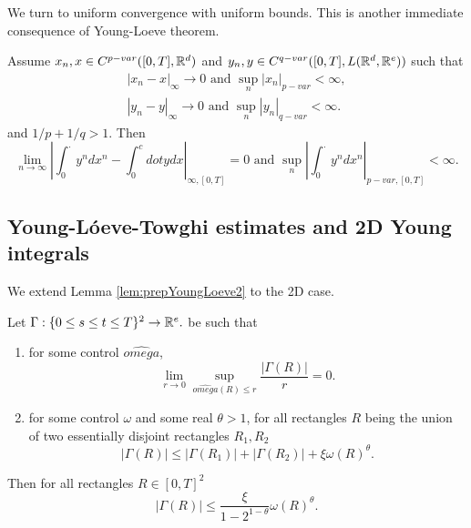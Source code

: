  We turn to uniform convergence with uniform bounds.
 This is another immediate consequence of Young-Loeve theorem.
 \begin{proposition}
    Assume \(x_n,x \in C^{p-var}([0,T], \mathbb{R}^d)\) and \(y_n,y \in C^{q-var}([0,T], L(\mathbb{R}^d,\mathbb{R}^e))\) such that
    \begin{align}
        |x_n - x|_\infty \rightarrow 0 \text{ and } \sup_n |x_n|_{p-var} < \infty, \\
        |y_n - y|_\infty \rightarrow 0 \text{ and } \sup_n |y_n|_{q-var} < \infty.
    \end{align}
    and \(1/p + 1/q > 1\).
    Then 
    \begin{equation}
        \lim_{n \rightarrow \infty} \left| \int_0^\cdot y^n dx^n - \int_0^cdot y dx \right|_{\infty,[0,T]} = 0 \text{ and } \sup_n \left| \int_0^\cdot y^n dx^n \right|_{p-var,[0,T]} < \infty.
    \end{equation}
 \end{proposition}

\subsection{Young-Lóeve-Towghi estimates and 2D Young integrals}

We extend Lemma \ref{lem:prepYoungLoeve2} to the 2D case.

\begin{lemma}\label{lem:prepYoungLoeve2D}
    Let \(\Gamma:\{ 0 \le s \le t \le T\}^2 \rightarrow \mathbb{R}^e.\) be such that 
    \begin{enumerate}
        \item for some control \(\hat{omega}\),
        \begin{equation}
            \lim_{r \rightarrow 0} \sup_{\hat{omega}(R) \le r} \frac{|\Gamma(R)|}{r} = 0.
        \end{equation}
        \item for some control \(\omega\) and some real \(\theta > 1\), for all rectangles \(R\) being the union of two essentially disjoint rectangles \(R_1,R_2\)
        \begin{equation}
            |\Gamma(R)| \le |\Gamma(R_1)| + |\Gamma(R_2)| + \xi \omega(R)^\theta. 
        \end{equation}
    \end{enumerate}
    Then for all rectangles \(R \in [0,T]^2\) 
    \begin{equation}
        |\Gamma(R)| \le \frac{\xi}{1 - 2^{1- \theta}} \omega(R)^\theta.
    \end{equation}
\end{lemma}

